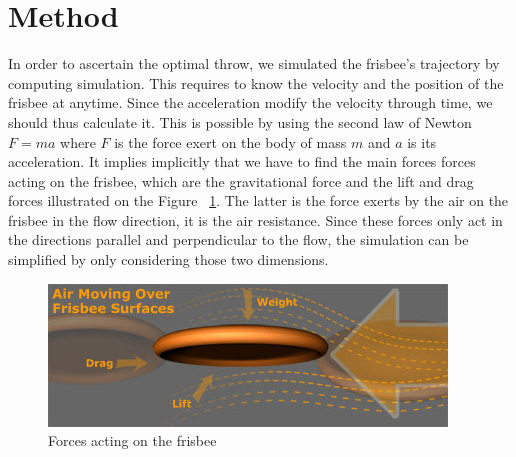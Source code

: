 \documentclass[10pt,a4paper]{report}
\begin{document}
\section{Method}
In order to ascertain the optimal throw, we simulated the frisbee's trajectory by computing simulation. This requires to know the velocity and the position of the frisbee at anytime. Since the acceleration modify the velocity through time, we should thus calculate it. This is possible by using the second law of Newton $F = ma$ where $F$ is the force exert on the body of mass $m$ and $a$ is its acceleration. It implies implicitly that we have to find the main forces forces acting on the frisbee,  which are the gravitational force and the lift and drag forces illustrated on the Figure ~\ref{Forces acting on the frisbee}. The latter is the force exerts by the air on the frisbee in the flow direction, it is the air resistance. Since these forces only act in the directions parallel and perpendicular to the flow, the simulation can be simplified by only considering those two dimensions.

\begin{figure}[H]
\centering
\includegraphics[scale=0.8]{forces.jpg}
\caption{Forces acting on the frisbee}
\label{Forces acting on the frisbee}
\end{figure}
\end{document}
